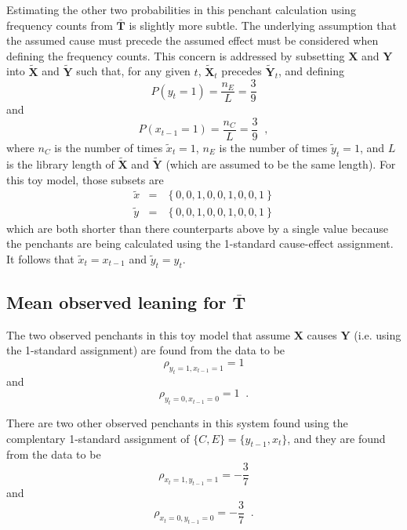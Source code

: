 \documentclass[a4paper,11pt,twocolumn]{article}
\begin{document}
Estimating the other two probabilities in this penchant calculation using frequency counts from $\bar{\mathbf{T}}$ is slightly more subtle.  The underlying assumption that the assumed cause must precede the assumed effect must be considered when defining the frequency counts.  This concern is addressed by subsetting $\mathbf{X}$ and $\mathbf{Y}$ into $\tilde{\mathbf{X}}$ and $\tilde{\mathbf{Y}}$ such that, for any given $t$, $\tilde{\mathbf{X}}_t$ precedes $\tilde{\mathbf{Y}}_t$, and defining 
\begin{equation}
P\left( y_t = 1\right) = \frac{n_E}{L} = \frac{3}{9}
\end{equation}
and
\begin{equation}
P\left( x_{t-1} = 1\right) = \frac{n_C}{L} = \frac{3}{9}\;\;,
\end{equation}
where $n_C$ is the number of times $\tilde{x}_t = 1$, $n_E$ is the number of times $\tilde{y}_t = 1$, and $L$ is the library length of $\tilde{\mathbf{X}}$ and $\tilde{\mathbf{Y}}$ (which are assumed to be the same length).  For this toy model, those subsets are
\begin{eqnarray*}
\tilde{x} &=& \left\{0,0,1,0,0,1,0,0,1\right\}\\
\tilde{y} &=& \left\{0,0,1,0,0,1,0,0,1\right\}
\end{eqnarray*}
which are both shorter than there counterparts above by a single value because the penchants are being calculated using the 1-standard cause-effect assignment.  It follows that $\tilde{x}_t = x_{t-1}$ and $\tilde{y}_t=y_t$.  

\subsection{Mean observed leaning for $\bar{\mathbf{T}}$}
The two observed penchants in this toy model that assume $\mathbf{X}$ causes $\mathbf{Y}$ (i.e. using the 1-standard assignment) are found from the data to be
\begin{equation}
\rho_{y_t=1,x_{t-1}=1}=1
\end{equation}
and
\begin{equation}
\rho_{y_t=0,x_{t-1}=0}=1\;\;.
\end{equation}

There are two other observed penchants in this system found using the complentary 1-standard assignment of $\{C,E\}=\{y_{t-1},x_t\}$, and they are found from the data to be
\begin{equation}
\rho_{x_t=1,y_{t-1}=1}=-\frac{3}{7}
\end{equation}
and
\begin{equation}
\rho_{x_t=0,y_{t-1}=0}=-\frac{3}{7}\;\;.
\end{equation}
\end{document}

